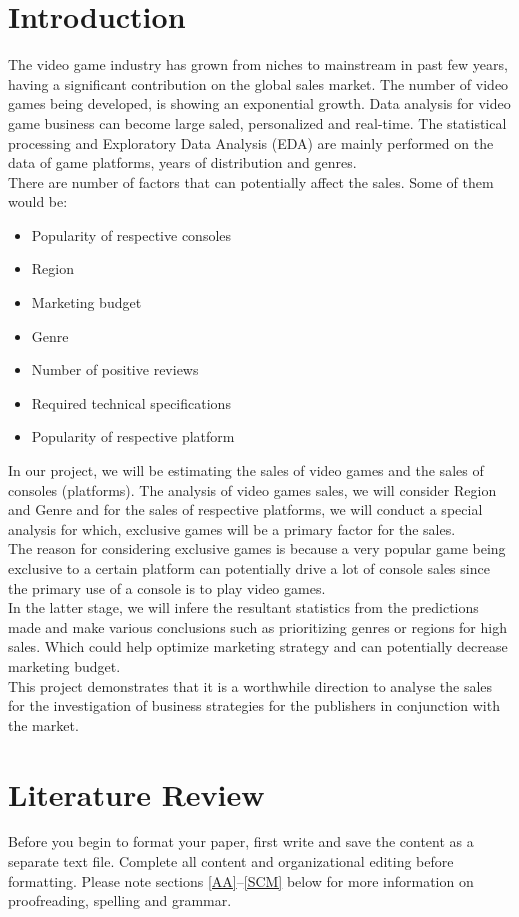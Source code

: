 \documentclass[conference]{IEEEtran}
\begin{document}
\section{Introduction}
The video game industry has grown from niches to mainstream in past few years, having a significant contribution on the global sales market. The number of video games being developed, is showing an exponential growth. Data analysis for video game business can become large saled, personalized and real-time. The
statistical processing and Exploratory Data Analysis (EDA) are mainly performed on the data of game platforms, years of distribution and genres.\\
There are number of factors that can potentially affect the sales. Some of them would be:
\begin{itemize}
    \item Popularity of respective consoles
    \item Region
    \item Marketing budget
    \item Genre
    \item Number of positive reviews
    \item Required technical specifications
    \item Popularity of respective platform
\end{itemize}
In our project, we will be estimating the sales of video games and the sales of consoles (platforms). The analysis of video games sales, we will consider Region and Genre and for the sales of respective platforms, we will conduct a special analysis for which, exclusive games will be a primary factor for the sales.\\ The reason for considering exclusive games is because a very popular game being exclusive to a certain platform can potentially drive a lot of console sales since the primary use of a console is to play video games.\\
In the latter stage, we will infere the resultant statistics from the predictions made and make various conclusions such as prioritizing genres or regions for high sales. Which could help optimize marketing strategy and can potentially decrease marketing budget.\\
This project demonstrates that it is a worthwhile direction to analyse the sales for the investigation of business strategies for the publishers in conjunction with the market.



\section{Literature Review}
Before you begin to format your paper, first write and save the content as a
separate text file. Complete all content and organizational editing before
formatting. Please note sections \ref{AA}--\ref{SCM} below for more information on
proofreading, spelling and grammar.
\end{document}
